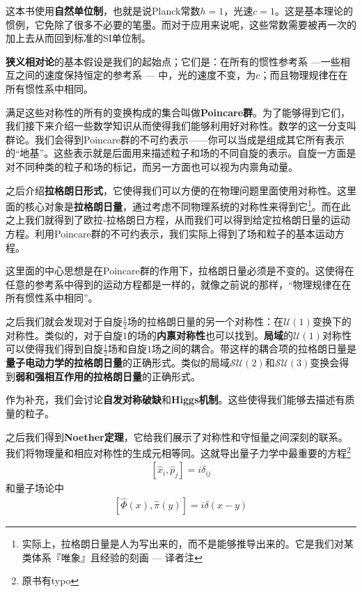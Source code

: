 这本书使用{\bf 自然单位制}，也就是说Planck常数$h = 1$，光速$c=1$。这是基本理论的惯例，它免除了很多不必要的笔墨。而对于应用来说呢，这些常数需要被再一次的加上去从而回到标准的SI单位制。

{\bf 狭义相对论}的基本假设是我们的起始点；它们是：在所有的惯性参考系 ---一些相互之间的速度保持恒定的参考系 --- 中，光的速度不变，为$c$；而且物理规律在在所有惯性系中相同。

满足这些对称性的所有的变换构成的集合叫做{\bf Poincare群}。为了能够得到它们，我们接下来介绍一些数学知识从而使得我们能够利用好对称性。数学的这一分支叫群论。我们会得到Poincare群的不可约表示——你可以当成是组成其它所有表示的“地基”。这些表示就是后面用来描述粒子和场的不同自旋的表示。自旋一方面是对不同种类的粒子和场的标记，而另一方面也可以视为内禀角动量。

之后介绍{\bf 拉格朗日形式}，它使得我们可以方便的在物理问题里面使用对称性。这里面的核心对象是{\bf 拉格朗日量}，通过考虑不同物理系统的对称性来得到它\footnote{实际上，拉格朗日量是人为写出来的，而不是能够推导出来的。它是我们对某类体系『唯象』且经验的刻画 --- 译者注}。而在此之上我们就得到了欧拉-拉格朗日方程，从而我们可以得到给定拉格朗日量的运动方程。利用Poincare群的不可约表示，我们实际上得到了场和粒子的基本运动方程。

这里面的中心思想是在Poincare群的作用下，拉格朗日量必须是不变的。这使得在任意的参考系中得到的运动方程都是一样的，就像之前说的那样，“物理规律在在所有惯性系中相同”。

之后我们就会发现对于自旋$\tfrac{1}{2}$场的拉格朗日量的另一个对称性：在$\mathcal{U}(1)$变换下的对称性。类似的，对于自旋$1$的场的{\bf 内禀对称性}也可以找到。{\bf 局域}的$\mathcal{U}(1)$对称性可以使得我们得到自旋$\tfrac{1}{2}$场和自旋$1$场之间的耦合。带这样的耦合项的拉格朗日量是{\bf 量子电动力学的拉格朗日量}的正确形式。类似的局域$\mathcal{SU}(2)$和$\mathcal{SU}(3)$变换会得到{\bf 弱和强相互作用的拉格朗日量}的正确形式。

作为补充，我们会讨论{\bf 自发对称破缺}和{\bf Higgs机制}。这些使得我们能够去描述有质量的粒子。

之后我们得到{\bf Noether定理}，它给我们展示了对称性和守恒量之间深刻的联系。我们将物理量和相应对称性的生成元相等同。这就导出量子力学中最重要的方程\footnote{原书有typo}
\begin{align}\label{eq1.1}
[\hat{x}_i,\hat{p}_j]=i\delta_{ij}
\end{align}
和量子场论中
\begin{align}\label{eq1.2}
[\hat{\Phi}(x),\hat{\pi}(y)]=i\delta(x-y)
\end{align}

